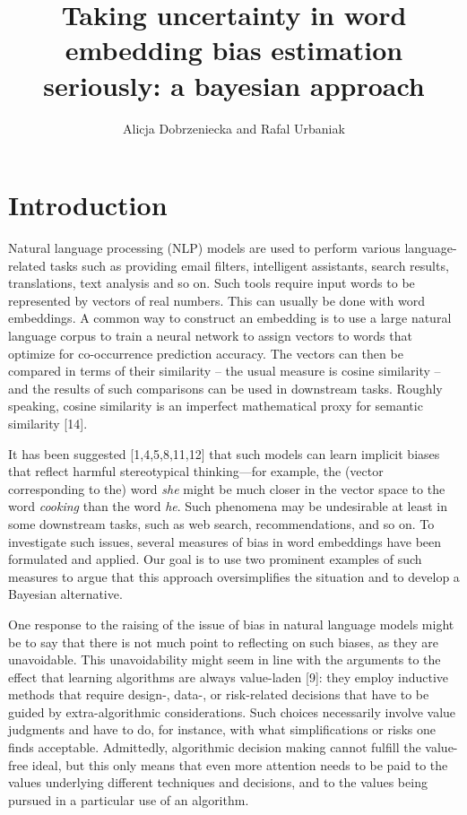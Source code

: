 \documentclass[
  12pt,
  dvipsnames,enabledeprecatedfontcommands]{scrartcl}
\title{Taking uncertainty in word embedding bias estimation seriously: a
bayesian approach}
\author{Alicja Dobrzeniecka and Rafal Urbaniak}
\date{}
\begin{document}
\maketitle

\hypertarget{introduction}{%
\section{Introduction}\label{introduction}}

Natural language processing (NLP) models are used to perform various
language-related tasks such as providing email filters, intelligent
assistants, search results, translations, text analysis and so on. Such
tools require input words to be represented by vectors of real numbers.
This can usually be done with word embeddings. A common way to construct
an embedding is to use a large natural language corpus to train a neural
network to assign vectors to words that optimize for co-occurrence
prediction accuracy. The vectors can then be compared in terms of their
similarity -- the usual measure is cosine similarity -- and the results
of such comparisons can be used in downstream tasks. Roughly speaking,
cosine similarity is an imperfect mathematical proxy for semantic
similarity {[}14{]}.

It has been suggested {[}1,4,5,8,11,12{]} that such models can learn
implicit biases that reflect harmful stereotypical thinking---for
example, the (vector corresponding to the) word \textit{she} might be
much closer in the vector space to the word \textit{cooking} than the
word \textit{he}. Such phenomena may be undesirable at least in some
downstream tasks, such as web search, recommendations, and so on. To
investigate such issues, several measures of bias in word embeddings
have been formulated and applied. Our goal is to use two prominent
examples of such measures to argue that this approach oversimplifies the
situation and to develop a Bayesian alternative.

One response to the raising of the issue of bias in natural language
models might be to say that there is not much point to reflecting on
such biases, as they are unavoidable. This unavoidability might seem in
line with the arguments to the effect that learning algorithms are
always value-laden {[}9{]}: they employ inductive methods that require
design-, data-, or risk-related decisions that have to be guided by
extra-algorithmic considerations. Such choices necessarily involve value
judgments and have to do, for instance, with what simplifications or
risks one finds acceptable. Admittedly, algorithmic decision making
cannot fulfill the value-free ideal, but this only means that even more
attention needs to be paid to the values underlying different techniques
and decisions, and to the values being pursued in a particular use of an
algorithm.
\end{document}

